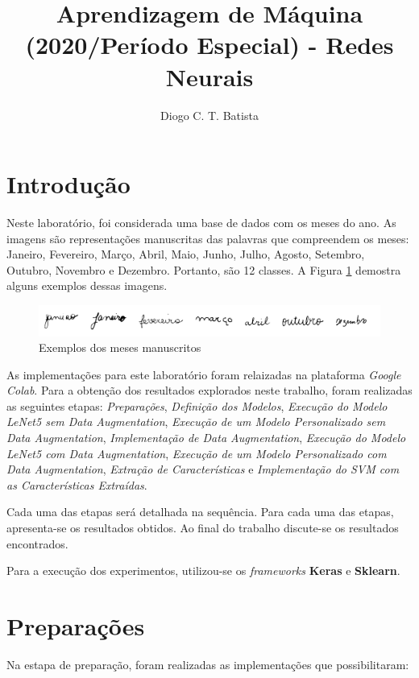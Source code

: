 \documentclass[12pt]{article}
\title{Aprendizagem de Máquina (2020/Período Especial) - Redes Neurais}
\author{Diogo C. T. Batista\inst{1}}
\begin{document}
\maketitle

\section{Introdução}

Neste laboratório, foi considerada uma base de dados com os meses do ano. As imagens são representações manuscritas das palavras que compreendem os meses: Janeiro, Fevereiro, Março, Abril, Maio, Junho, Julho, Agosto, Setembro, Outubro, Novembro e Dezembro. Portanto, são 12 classes. A Figura \ref{fig:image_months} demostra alguns exemplos dessas imagens.

\begin{figure}[!htb]
  \centering
  \includegraphics[width=35em]{images/image_months.png}
  \caption{Exemplos dos meses manuscritos}
  \label{fig:image_months}
\end{figure}

As implementações para este laboratório foram relaizadas na plataforma \textit{Google Colab}. Para a obtenção dos resultados explorados neste trabalho, foram realizadas as seguintes etapas: \textit{Preparações}, \textit{Definição dos Modelos}, \textit{Execução do Modelo LeNet5 sem Data Augmentation}, \textit{Execução de um Modelo Personalizado sem Data Augmentation}, \textit{Implementação de Data Augmentation}, \textit{Execução do Modelo LeNet5 com Data Augmentation}, \textit{Execução de um Modelo Personalizado com Data Augmentation}, \textit{Extração de Características} e \textit{Implementação do SVM com as Características Extraídas}.

Cada uma das etapas será detalhada na sequência. Para cada uma das etapas, apresenta-se os resultados obtidos. Ao final do trabalho discute-se os resultados encontrados.

Para a execução dos experimentos, utilizou-se os \textit{frameworks} \textbf{Keras} e \textbf{Sklearn}.

\section{Preparações}

Na estapa de preparação, foram realizadas as implementações que possibilitaram:
\end{document}
